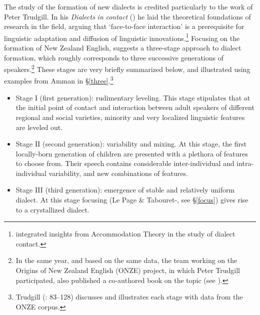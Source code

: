 \documentclass[output=paper]{langsci/langscibook}
\begin{document}
The study of the formation of new dialects is credited particularly to the work of Peter Trudgill. In his \textit{Dialects} \textit{in} \textit{contact} (\citeyear{Trudgill1986}) he laid the theoretical foundations of research in the field, arguing that ‘face-to-face interaction’ is a prerequisite for linguistic adaptation and diffusion of linguistic innovations.\footnote{\citet{Trudgill1986} integrated insights from Accommodation Theory \citep{Giles1973} in the study of dialect contact.} Focusing on the formation of New Zealand English, \citet{Trudgill2004} suggests a three-stage approach to dialect formation, which roughly corresponds to three successive generations of speakers.\footnote{In the same year, and based on the same data, the team working on the Origins of New Zealand English (ONZE) project, in which Peter Trudgill participated, also published a co-authored book on the topic (see \citealt{GordonEtAl2004}).} These stages are very briefly summarized below, and illustrated using examples from Amman in §\ref{three}.\footnote{Trudgill (\citeyear{Trudgill2004}: 83–128) discusses and illustrates each stage with data from the ONZE corpus.}

\begin{itemize}
    \item 
Stage I (first generation): rudimentary leveling. This stage stipulates that at the initial point of contact and interaction between adult speakers of different regional and social varieties, minority and very localized linguistic features are leveled out.

\item 
Stage II (second generation): variability and mixing. At this stage, the first locally-born generation of children are presented with a plethora of features to choose from. Their speech contains considerable inter-individual and intra-individual variability, and new combinations of features.

\item 
Stage III (third generation): emergence of stable and relatively uniform dialect. At this stage focusing (Le Page \& Tabouret-\citealt{Keller1985}, see §\ref{focus}) gives rise to a crystallized dialect. 
\end{itemize}
\end{document}
